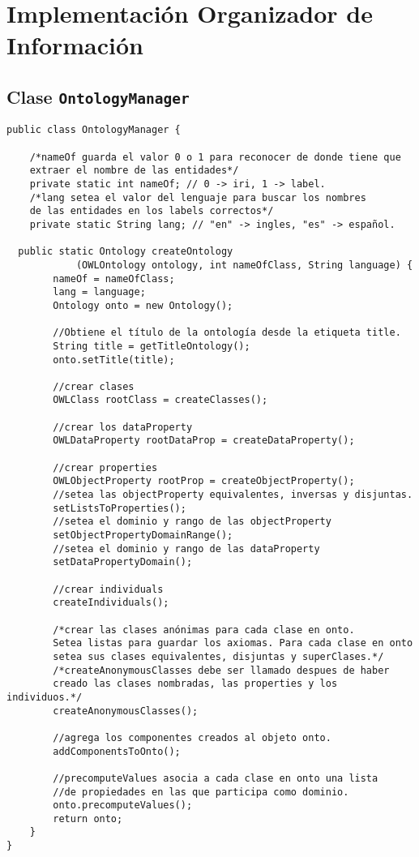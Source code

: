 \section{Implementación Organizador de Información}
\label{apx:impl_org_inf}

\subsection{Clase \texttt{OntologyManager}}
\label{sec:clase_ontologymanager}

\begin{verbatim}
public class OntologyManager {

    /*nameOf guarda el valor 0 o 1 para reconocer de donde tiene que
    extraer el nombre de las entidades*/
    private static int nameOf; // 0 -> iri, 1 -> label.
    /*lang setea el valor del lenguaje para buscar los nombres
    de las entidades en los labels correctos*/
    private static String lang; // "en" -> ingles, "es" -> español.

  public static Ontology createOntology
            (OWLOntology ontology, int nameOfClass, String language) {
        nameOf = nameOfClass;
        lang = language;
        Ontology onto = new Ontology();
        
        //Obtiene el título de la ontología desde la etiqueta title.
        String title = getTitleOntology();
        onto.setTitle(title);
        
        //crear clases
        OWLClass rootClass = createClasses();

        //crear los dataProperty
        OWLDataProperty rootDataProp = createDataProperty();
        
        //crear properties
        OWLObjectProperty rootProp = createObjectProperty();
        //setea las objectProperty equivalentes, inversas y disjuntas.
        setListsToProperties();
        //setea el dominio y rango de las objectProperty
        setObjectPropertyDomainRange();
        //setea el dominio y rango de las dataProperty
        setDataPropertyDomain();
        
        //crear individuals
        createIndividuals();
        
        /*crear las clases anónimas para cada clase en onto.
        Setea listas para guardar los axiomas. Para cada clase en onto
        setea sus clases equivalentes, disjuntas y superClases.*/
        /*createAnonymousClasses debe ser llamado despues de haber
        creado las clases nombradas, las properties y los individuos.*/
        createAnonymousClasses();
        
        //agrega los componentes creados al objeto onto.
        addComponentsToOnto();
        
        //precomputeValues asocia a cada clase en onto una lista 
        //de propiedades en las que participa como dominio.
        onto.precomputeValues();
        return onto;
    }
}
\end{verbatim}

